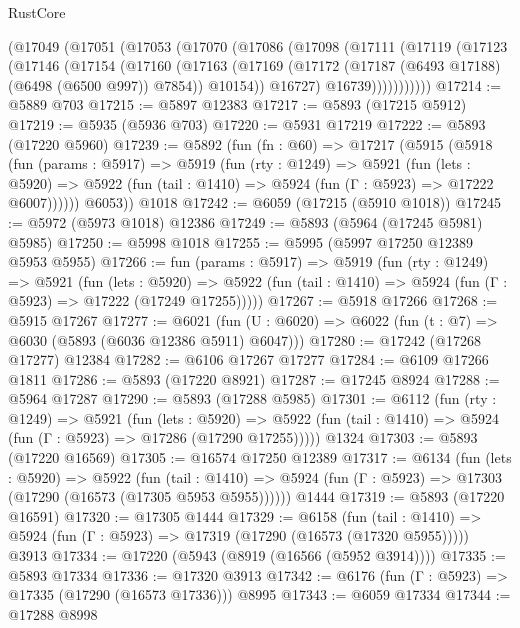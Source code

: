 \begin{lexlean}{RustCore}
\begin{coremodule}
    (@17049
      (@17051
        (@17053
          (@17070
            (@17086
              (@17098
                (@17111
                  (@17119
                    (@17123
                      (@17146
                        (@17154
                          (@17160
                            (@17163
                              (@17169
                                (@17172 (@17187 (@6493 @17188) (@6498 (@6500 @997)) @7854))
                                @10154))
                            @16727)
                          @16739)))))))))))
@17214 := @5889 @703
@17215 := @5897 @12383
@17217 := @5893 (@17215 @5912)
@17219 := @5935 (@5936 @703)
@17220 := @5931 @17219
@17222 := @5893 (@17220 @5960)
@17239 := @5892
    (fun (fn : @60) =>
    @17217
      (@5915
        (@5918
          (fun (params : @5917) =>
          @5919
            (fun (rty : @1249) =>
            @5921
              (fun (lets : @5920) =>
              @5922 (fun (tail : @1410) => @5924 (fun (Γ : @5923) => @17222 @6007))))))
        @6053))
    @1018
@17242 := @6059 (@17215 (@5910 @1018))
@17245 := @5972 (@5973 @1018) @12386
@17249 := @5893 (@5964 (@17245 @5981) @5985)
@17250 := @5998 @1018
@17255 := @5995 (@5997 @17250 @12389 @5953 @5955)
@17266 := fun (params : @5917) =>
  @5919
    (fun (rty : @1249) =>
    @5921
      (fun (lets : @5920) =>
      @5922 (fun (tail : @1410) => @5924 (fun (Γ : @5923) => @17222 (@17249 @17255)))))
@17267 := @5918 @17266
@17268 := @5915 @17267
@17277 := @6021
    (fun (U : @6020) => @6022 (fun (t : @7) => @6030 (@5893 (@6036 @12386 @5911) @6047)))
@17280 := @17242 (@17268 @17277) @12384
@17282 := @6106 @17267 @17277
@17284 := @6109 @17266 @1811
@17286 := @5893 (@17220 @8921)
@17287 := @17245 @8924
@17288 := @5964 @17287
@17290 := @5893 (@17288 @5985)
@17301 := @6112
    (fun (rty : @1249) =>
    @5921
      (fun (lets : @5920) =>
      @5922 (fun (tail : @1410) => @5924 (fun (Γ : @5923) => @17286 (@17290 @17255)))))
    @1324
@17303 := @5893 (@17220 @16569)
@17305 := @16574 @17250 @12389
@17317 := @6134
    (fun (lets : @5920) =>
    @5922
      (fun (tail : @1410) =>
      @5924 (fun (Γ : @5923) => @17303 (@17290 (@16573 (@17305 @5953 @5955))))))
    @1444
@17319 := @5893 (@17220 @16591)
@17320 := @17305 @1444
@17329 := @6158
    (fun (tail : @1410) => @5924 (fun (Γ : @5923) => @17319 (@17290 (@16573 (@17320 @5955)))))
    @3913
@17334 := @17220 (@5943 (@8919 (@16566 (@5952 @3914))))
@17335 := @5893 @17334
@17336 := @17320 @3913
@17342 := @6176 (fun (Γ : @5923) => @17335 (@17290 (@16573 @17336))) @8995
@17343 := @6059 @17334
@17344 := @17288 @8998

\end{coremodule}
\end{lexlean}
